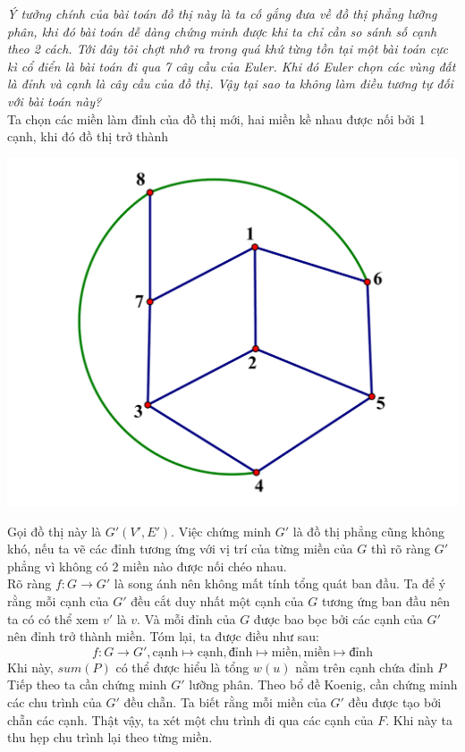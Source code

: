 \documentclass[11pt]{scrartcl}
\begin{document}
\begin{itemize}[label=, leftmargin=0em, itemsep=0.5em]
\begin{sol}
        \textbf{}\textit{Ý tưởng chính của bài toán đồ thị này là ta cố gắng đưa về đồ thị phẳng lưỡng phân, khi đó bài toán dễ dàng chứng minh được khi ta chỉ cần so sánh số cạnh theo 2 cách. Tới đây tôi chợt nhớ ra trong quá khứ từng tồn tại một bài toán cực kì cổ điển là bài toán đi qua 7 cây cầu của Euler. Khi đó Euler chọn các vùng đất là đỉnh và cạnh là cây cầu của đồ thị. Vậy tại sao ta không làm điều tương tự đối với bài toán này?}\\
        Ta chọn các miền làm đỉnh của đồ thị mới, hai miền kề nhau được nối bởi 1 cạnh, khi đó đồ thị trở thành
        \begin{center}
            \includegraphics[scale=0.22]{8.pdf}
        \end{center}
        Gọi đồ thị này là $G'(V',E')$. Việc chứng minh $G'$ là đồ thị phẳng cũng không khó, nếu ta vẽ các đỉnh tương ứng với vị trí của từng miền của $G$ thì rõ ràng $G'$ phẳng vì không có 2 miền nào được nối chéo nhau.\\
        Rõ ràng $f: G \to G'$ là song ánh nên không mất tính tổng quát ban đầu. Ta để ý rằng mỗi cạnh của $G'$ đều cắt duy nhất một cạnh của $G$ tương ứng ban đầu nên ta có có thể xem $v'$ là $v$. Và mỗi đỉnh của $G$ được bao bọc bởi các cạnh của $G'$ nên đỉnh trở thành miền. Tóm lại, ta được điều như sau:
        $$ f: G \to G', \text{cạnh} \mapsto \text{cạnh}, \text{đỉnh} \mapsto \text{miền}, \text{miền} \mapsto \text{đỉnh}
        $$
        Khi này,  $sum(P)$ có thể được hiểu là tổng $w(u)$ nằm trên cạnh chứa đỉnh $P$\\
        Tiếp theo ta cần chứng minh $G'$ lưỡng phân. Theo bổ đề Koenig, cần chứng minh các chu trình của $G'$ đều chẵn. Ta biết rằng mỗi miền của $G'$ đều được tạo bởi chẵn các cạnh. Thật vậy, ta xét một chu trình đi qua các cạnh của $F$. Khi này ta thu hẹp chu trình lại theo từng miền.\\

\end{sol}
\end{itemize}
\end{document}
